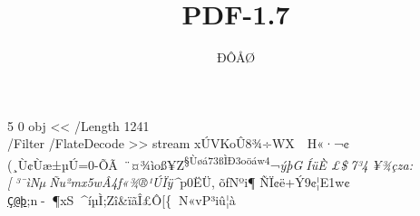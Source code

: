\documentclass[
]{article}
\title{PDF-1.7}
\author{ÐÔÅØ}
\date{}
\begin{document}
\maketitle

5 0 obj \textless\textless{} /Length 1241\\
/Filter /FlateDecode \textgreater\textgreater{} stream
xÚVKoÛ8¾÷WX~~H«·¬¢(¸Ù¢Ùæ±µÚ=0-ÕÃ~¨¤¾ìoß¥Z\textsuperscript{§Ùøá73ßÌÐ3oöáw4}¬\emph{ýþGÍüÈ
£\$­7³4¥¾çza:{[}³¯ìNµÑu²mx5wÂ4f«¾®¹ÚÏÿ\^{}}p0ËÜ, õfNºi¶
ÑÏ¢ë+Ý9­¢¦E1w¢\href{mailto:Ç@þ}{\nolinkurl{Ç@þ}};n-¶xS\^{}íµÌ;Zî\&ïãÎ£Ô{[}\{N«vP³iû¦à
\end{document}
